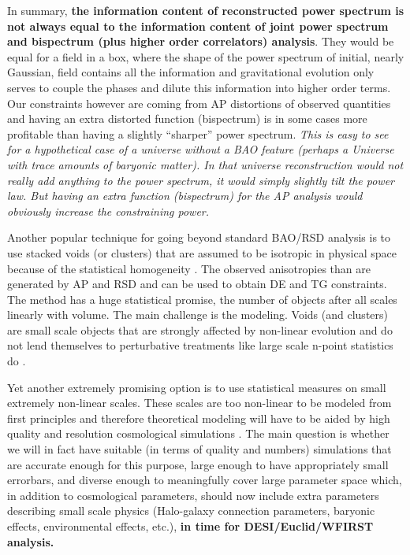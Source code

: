 In summary, \textbf{the information content of reconstructed power spectrum is not
always equal to the information content of joint power spectrum and bispectrum
(plus higher order correlators) analysis}. They would be equal for a field in a
box, where the shape of the power spectrum of initial, nearly Gaussian, field
contains all the information and gravitational evolution only serves to couple
the phases and dilute this information into higher order terms. Our constraints
however are coming from AP distortions of observed quantities and having an
extra distorted function (bispectrum) is in some cases more profitable than
having a slightly ``sharper'' power spectrum. \textit{This is easy to see for a
hypothetical case of a universe without a BAO feature (perhaps a Universe with
trace amounts of baryonic matter). In that universe reconstruction would not
really add anything to the power spectrum, it would simply slightly tilt the
power law. But having an extra function (bispectrum) for the AP analysis would
obviously increase the constraining power.}

Another popular technique for going beyond standard BAO/RSD analysis is to use
stacked voids (or clusters) that are assumed to be isotropic in physical space
because of the statistical homogeneity \cite{2015MNRAS.451.1036C,2015JCAP...11..036H,2016MNRAS.462.2465C,2017JCAP...07..014H}. The observed anisotropies than are
generated by AP and RSD and can be used to obtain DE and TG constraints. The
method has a huge statistical promise, the number of objects after all scales
linearly with volume. The main challenge is the modeling. Voids (and clusters)
are small scale objects that are strongly affected by non-linear evolution and
do not lend themselves to perturbative treatments like large scale n-point
statistics do \cite{2017arXiv171207575N}.

Yet another extremely promising option is to use statistical measures on small
extremely non-linear scales. These scales are too non-linear to be modeled from
first principles and therefore theoretical modeling will have to be aided by
high quality and resolution cosmological simulations
\cite{2014MNRAS.444..476R,2015ApJ...810...35K}. The main question is whether we
will in fact have suitable (in terms of quality and numbers) simulations that
are accurate enough for this purpose, large enough to have appropriately small
errorbars, and diverse enough to meaningfully cover large parameter space
which, in addition to cosmological parameters, should now include extra
parameters describing small scale physics (Halo-galaxy connection parameters,
baryonic effects, environmental effects, etc.), \textbf{in time for
DESI/Euclid/WFIRST analysis.}


